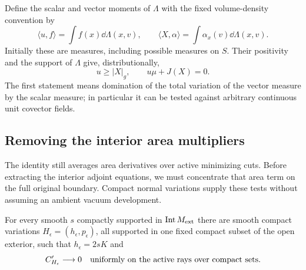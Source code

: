 Define the scalar and vector moments of $\Lambda$ with the fixed
volume-density convention by
\begin{equation}
 \langle u,f\rangle=\int f(x)\dd\Lambda(x,v),\qquad
 \langle X,\alpha\rangle=\int\alpha_x(v)\dd\Lambda(x,v).
 \label{q3:variation:moments}
\end{equation}
Initially these are measures, including possible measures on $S$.
Their positivity and the support of $\Lambda$ give, distributionally,
\begin{equation}
 u\ge |X|_g,\qquad u\mu+J(X)=0.
 \label{q3:variation:measure-complementarity}
\end{equation}
The first statement means domination of the total variation of the
vector measure by the scalar measure; in particular it can be tested
against arbitrary continuous unit covector fields.

\subsection{Removing the interior area multipliers}
\label{q3:variation:normal-slice-subsection}

The identity still averages area derivatives over active minimizing
cuts. Before extracting the interior adjoint equations, we must
concentrate that area term on the full original boundary. Compact
normal variations supply these tests without assuming an ambient
vacuum development.

\begin{lemma}
\label{q3:variation:normal-tests}
For every smooth $s$ compactly supported in
$\operatorname{Int}M_{\mathrm{ext}}$ there are smooth compact variations
$H_\epsilon=(h_\epsilon,p_\epsilon)$, all supported in one fixed compact
subset of the open exterior, such that $h_\epsilon=2sK$ and
\begin{equation}
 C'_{H_\epsilon}\longrightarrow0
 \quad\hbox{uniformly on the active rays over compact sets}.
 \label{q3:variation:normal-test-limit}
\end{equation}
\end{lemma}

